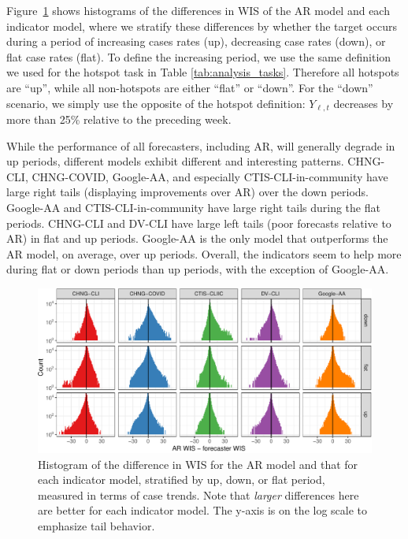 \documentclass[9pt,twocolumn,twoside,lineno]{pnas-new}
\begin{document}
Figure~\ref{fig:up_down_flat} shows histograms of the differences in WIS of the 
AR model and each indicator model, where we stratify these differences by
whether the target occurs during a period of increasing cases rates (up),
decreasing case rates (down), or flat case rates (flat). To define the
increasing period, we use the same definition we used for the hotspot task in
Table \ref{tab:analysis_tasks}.  Therefore all hotspots are ``up'', while all
non-hotspots are either ``flat'' or ``down''.  For the ``down'' scenario, we 
simply use the opposite of the hotspot definition: $Y_{\ell,t}$ decreases by
more than 25\% relative to the preceding week.  

While the performance of all forecasters, including AR, will generally degrade
in up periods, different models exhibit different and interesting patterns.
CHNG-CLI, CHNG-COVID, Google-AA, and especially CTIS-CLI-in-community have
large right tails (displaying improvements over AR) over the down periods.
Google-AA and CTIS-CLI-in-community have large right tails during the flat
periods. CHNG-CLI and DV-CLI have large left tails (poor forecasts relative to
AR) in flat and up periods.  Google-AA is the only model that outperforms
the AR model, on average, over up periods.  Overall, the indicators seem to help
more during flat or down periods than up periods, with the exception of
Google-AA.    

\begin{figure}[t]
  \includegraphics[width=\textwidth]{fig/upswing-histogram-1.pdf}
  \caption{Histogram of the difference in WIS for the AR model and that for each
    indicator model, stratified by up, down, or flat period, measured in terms
    of case trends. Note that \textit{larger} differences here are better for
    each indicator model.  The y-axis is on the log scale to emphasize tail 
    behavior.}   
  \label{fig:up_down_flat}
\end{figure}
\end{document}
